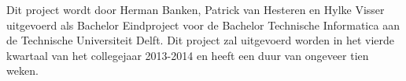 Dit project wordt door Herman Banken, Patrick van Hesteren en Hylke Visser uitgevoerd als Bachelor Eindproject voor de Bachelor Technische Informatica aan de Technische Universiteit Delft. Dit project zal uitgevoerd worden in het vierde kwartaal van het collegejaar 2013-2014 en heeft een duur van ongeveer tien weken.